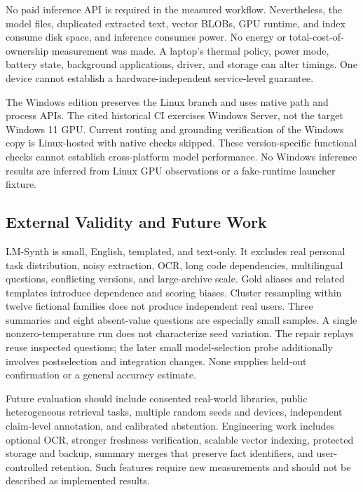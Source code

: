 \documentclass[conference,letterpaper]{IEEEtran}
\begin{document}
No paid inference API is required in the measured workflow. Nevertheless, the model files, duplicated extracted text, vector BLOBs, GPU runtime, and index consume disk space, and inference consumes power. No energy or total-cost-of-ownership measurement was made. A laptop's thermal policy, power mode, battery state, background applications, driver, and storage can alter timings. One device cannot establish a hardware-independent service-level guarantee.

The Windows edition preserves the Linux branch and uses native path and process APIs. The cited historical CI exercises Windows Server, not the target Windows 11 GPU. Current routing and grounding verification of the Windows copy is Linux-hosted with native checks skipped. These version-specific functional checks cannot establish cross-platform model performance. No Windows inference results are inferred from Linux GPU observations or a fake-runtime launcher fixture.

\subsection{External Validity and Future Work}
LM-Synth is small, English, templated, and text-only. It excludes real personal task distribution, noisy extraction, OCR, long code dependencies, multilingual questions, conflicting versions, and large-archive scale. Gold aliases and related templates introduce dependence and scoring biases. Cluster resampling within twelve fictional families does not produce independent real users. Three summaries and eight absent-value questions are especially small samples. A single nonzero-temperature run does not characterize seed variation. The repair replays reuse inspected questions; the later small model-selection probe additionally involves postselection and integration changes. None supplies held-out confirmation or a general accuracy estimate.

Future evaluation should include consented real-world libraries, public heterogeneous retrieval tasks, multiple random seeds and devices, independent claim-level annotation, and calibrated abstention. Engineering work includes optional OCR, stronger freshness verification, scalable vector indexing, protected storage and backup, summary merges that preserve fact identifiers, and user-controlled retention. Such features require new measurements and should not be described as implemented results.
\end{document}
